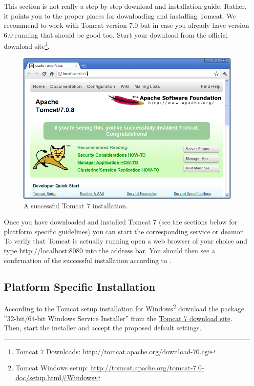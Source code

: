 \documentclass[a4paper,10pt,twoside]{book}
\begin{document}
This section is not really a step by step download and installation guide. 
Rather, it points you to the proper places for downloading and installing Tomcat.
We recommend to work with Tomcat version 7.0 but in case you already have version 6.0 running that should be good too.
Start your download from the official download site\footnote{
Tomcat 7 Downloads: \url{http://tomcat.apache.org/download-70.cgi}
}.

\begin{figure}
\includegraphics[width=14cm]{tomcat_install.png}
\caption{A successful Tomcat 7 installation.}
\end{figure}

Once you have downloaded and installed Tomcat 7 (see the sections below for plattform specific guidelines) you can start the corresponding service or deamon.
To verify that Tomcat is actually running open a web browser of your choice and type \url{http://localhost:8080} into the address bar.
You should then see a confirmation of the successful installation according to .

\subsection{Platform Specific Installation}

According to the Tomcat setup installation for Windows\footnote{
Tomcat Windows setup: \url{http://tomcat.apache.org/tomcat-7.0-doc/setup.html#Windows}
}
download the package ''32-bit/64-bit Windows Service Installer'' from the \href{http://tomcat.apache.org/download-70.cgi}{Tomcat 7 download site}.
Then, start the installer and accept the proposed default settings.
\end{document}
